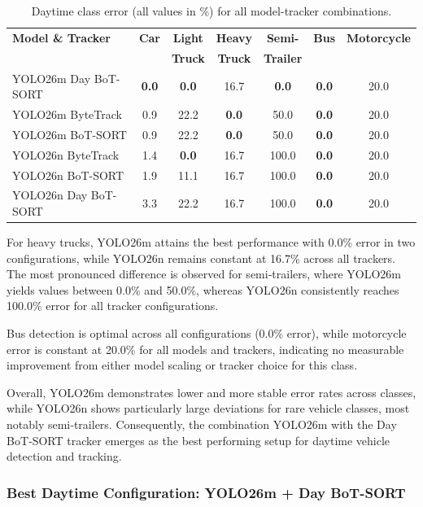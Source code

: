 \begin{table}[H]
\caption[Daytime class error for all model-tracker combinations]{Daytime class error (all values in \%) for all model-tracker combinations.}
\centering
\small
\begin{tabular}{l c c c c c c}
\toprule
\textbf{Model \& Tracker} & \textbf{Car} & \textbf{Light} & \textbf{Heavy} & \textbf{Semi-} & \textbf{Bus} & \textbf{Motorcycle} \\
 & & \textbf{Truck} & \textbf{Truck} & \textbf{Trailer} & & \\
\midrule
YOLO26m Day BoT-SORT & \textbf{0.0} & \textbf{0.0} & 16.7 & \textbf{0.0} & \textbf{0.0} & 20.0 \\
YOLO26m ByteTrack & 0.9 & 22.2 & \textbf{0.0} & 50.0 & \textbf{0.0} & 20.0 \\
YOLO26m BoT-SORT & 0.9 & 22.2 & \textbf{0.0} & 50.0 & \textbf{0.0} & 20.0 \\
YOLO26n ByteTrack & 1.4 & \textbf{0.0} & 16.7 & 100.0 & \textbf{0.0} & 20.0 \\
YOLO26n BoT-SORT & 1.9 & 11.1 & 16.7 & 100.0 & \textbf{0.0} & 20.0 \\
YOLO26n Day BoT-SORT & 3.3 & 22.2 & 16.7 & 100.0 & \textbf{0.0} & 20.0 \\
\bottomrule
\end{tabular}
\label{tab:daytime_class_errors}
\end{table}

For heavy trucks, YOLO26m attains the best performance with 0.0\% error in two configurations, while YOLO26n remains constant at 16.7\% across all trackers. The most pronounced difference is observed for semi‑trailers, where YOLO26m yields values between 0.0\% and 50.0\%, whereas YOLO26n consistently reaches 100.0\% error for all tracker configurations.

Bus detection is optimal across all configurations (0.0\% error), while motorcycle error is constant at 20.0\% for all models and trackers, indicating no measurable improvement from either model scaling or tracker choice for this class.


Overall, YOLO26m demonstrates lower and more stable error rates across classes, while YOLO26n shows particularly large deviations for rare vehicle classes, most notably semi‑trailers. Consequently, the combination YOLO26m with the Day BoT‑SORT tracker emerges as the best performing setup for daytime vehicle detection and tracking.

\subsubsection{Best Daytime Configuration: YOLO26m + Day BoT-SORT}

